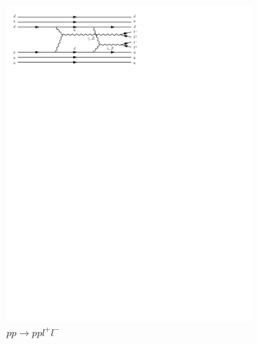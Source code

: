 \begin{figure}[h]
\begin{subfigure}[b]{0.3\textwidth}
    \includegraphics[trim={0.5cm 22cm 10cm 0cm},width=\textwidth]{../Diagrams/D8.pdf}
    \caption{$pp\rightarrow ppl^+l^-$}
    \label{fey:8}
  \end{subfigure}%
  ~
  \begin{subfigure}[b]{0.3\textwidth}

\end{subfigure}
\end{figure}
